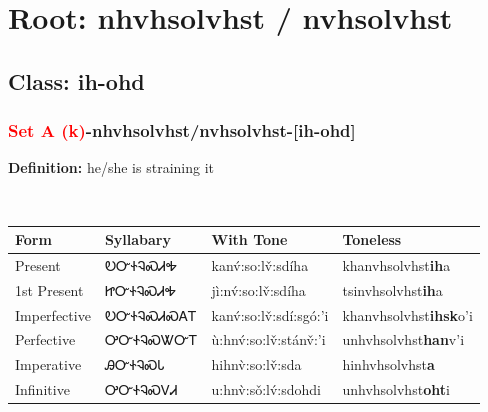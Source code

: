\needspace{4in}
\section*{Root: nhvhsolvhst / nvhsolvhst}
\nopagebreak
{}
\needspace{3in}
\subsection*{Class: ih-ohd}
\nopagebreak
\needspace{2in}
\subsubsection*{\textcolor{Red}{Set A (k)}{-}\textbf{nhvhsolvhst/nvhsolvhst}{-}[ih-ohd]}
\nopagebreak
\textbf{Definition: } he/she is straining it
\\[0.5em]
\begin{tabularx}{\textwidth}{l X X X}%
\toprule%
\textbf{Form}&\textbf{Syllabary}&\textbf{With Tone}&\textbf{Toneless}\\%
\midrule%
Present&ᎧᏅᏐᎸᏍᏗᎭ&kanv́:so:lv̌:sdíha&khanvhsolvhst\textbf{ih}a\\%
1st Present&ᏥᏅᏐᎸᏍᏗᎭ&jì:nv́:so:lv̌:sdíha&tsinvhsolvhst\textbf{ih}a\\%
Imperfective&ᎧᏅᏐᎸᏍᏗᏍᎪᎢ&kanv́:so:lv̌:sdí:sgó:’i&khanvhsolvhst\textbf{ihsk}o'i\\%
Perfective&ᎤᏅᏐᎸᏍᏔᏅᎢ&ù:hnv́:so:lv̌:stánv̌:’i&unhvhsolvhst\textbf{han}v'i\\%
Imperative&ᎯᏅᏐᎸᏍᏓ&hihnv̀:so:lv̌:sda&hinhvhsolvhst\textbf{a}\\%
Infinitive&ᎤᏅᏐᎸᏍᏙᏗ&u:hnv̀:sǒ:lv́:sdohdi&unhvhsolvhst\textbf{oht}i\\%
\bottomrule%
\end{tabularx}
\\[1em]